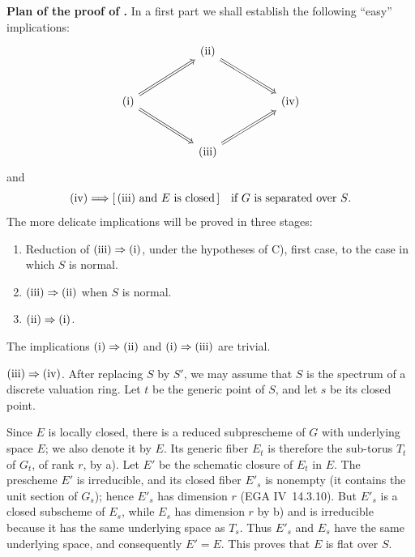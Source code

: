 \noindent\textbf{Plan of the proof of .} In a first part we shall
establish the following ``easy'' implications:
\[
\begin{tikzcd}[column sep=huge,row sep=large]
 & \textup{(ii)} \arrow[dr,Rightarrow] & \\
\textup{(i)} \arrow[ur,Rightarrow] \arrow[dr,Rightarrow] && \textup{(iv)} \\
 & \textup{(iii)} \arrow[ur,Rightarrow] &
\end{tikzcd}
\]
and
\[
  \textup{(iv)}
  \Longrightarrow
  [\,\textup{(iii)}\text{ and }E\text{ is closed}\,]
  \quad\text{if \(G\) is separated over \(S\)}.
\]
The more delicate implications will be proved in three stages:
\begin{enumerate}
\item[\normalfont I)] Reduction of
\(\textup{(iii)}\Rightarrow\textup{(i)}\), under the hypotheses of
C), first case, to the case in which \(S\) is normal.
\item[\normalfont II)] \(\textup{(iii)}\Rightarrow\textup{(ii)}\)
when \(S\) is normal.
\item[\normalfont III)] \(\textup{(ii)}\Rightarrow\textup{(i)}\).
\end{enumerate}


The implications \(\textup{(i)}\Rightarrow\textup{(ii)}\) and
\(\textup{(i)}\Rightarrow\textup{(iii)}\) are trivial.

\medskip
\noindent\(\textup{(iii)}\Rightarrow\textup{(iv)}\).
After replacing \(S\) by \(S'\), we may assume that \(S\) is the
spectrum of a discrete valuation ring. Let \(t\) be the generic point
of \(S\), and let \(s\) be its closed point.

Since \(E\) is locally closed, there is a reduced subprescheme of
\(G\) with underlying space \(E\); we also denote it by \(E\). Its
generic fiber \(E_t\) is therefore the sub-torus \(T_t\) of \(G_t\),
of rank \(r\), by \textup{ a)}. Let \(E'\) be the schematic
closure of \(E_t\) in \(E\). The prescheme \(E'\) is irreducible, and
its closed fiber \(E'_s\) is nonempty (it contains the unit section
of \(G_s\)); hence \(E'_s\) has dimension \(r\) (EGA IV~14.3.10).
But \(E'_s\) is a closed subscheme of \(E_s\), while \(E_s\) has
dimension \(r\) by \textup{ b)} and is irreducible because it
has the same underlying space as \(T_s\). Thus \(E'_s\) and \(E_s\)
have the same underlying space, and consequently \(E'=E\). This
proves that \(E\) is flat over \(S\).

